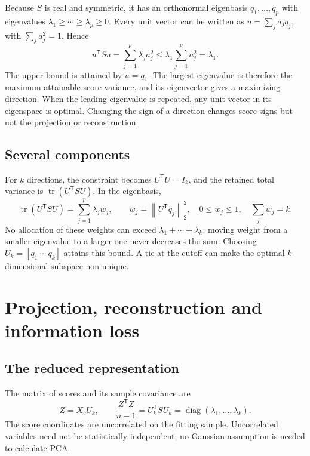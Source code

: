 \documentclass[11pt,a4paper,english]{article}
\numberwithin{equation}{section}
\DeclareMathOperator{\tr}{tr}
\newcommand{\norm}[1]{\left\lVert#1\right\rVert}
\newcommand{\T}{^{\mathsf T}}
\begin{document}
Because $S$ is real and symmetric, it has an orthonormal eigenbasis $q_1,\ldots,q_p$ with eigenvalues $\lambda_1\geq\cdots\geq\lambda_p\geq0$. Every unit vector can be written as $u=\sum_j a_jq_j$, with $\sum_j a_j^2=1$. Hence
\begin{equation}
u\T Su=\sum_{j=1}^p\lambda_j a_j^2
\leq\lambda_1\sum_{j=1}^p a_j^2=\lambda_1.
\label{eq:maximum}
\end{equation}
The upper bound is attained by $u=q_1$. The largest eigenvalue is therefore the maximum attainable score variance, and its eigenvector gives a maximizing direction. When the leading eigenvalue is repeated, any unit vector in its eigenspace is optimal. Changing the sign of a direction changes score signs but not the projection or reconstruction.

\subsection{Several components}
For $k$ directions, the constraint becomes $U\T U=I_k$, and the retained total variance is $\tr(U\T SU)$. In the eigenbasis,
\begin{equation}
\tr(U\T SU)=\sum_{j=1}^p\lambda_j w_j,
\qquad w_j=\norm{U\T q_j}_2^2,
\quad 0\leq w_j\leq1,\quad\sum_jw_j=k.
\end{equation}
No allocation of these weights can exceed $\lambda_1+\cdots+\lambda_k$: moving weight from a smaller eigenvalue to a larger one never decreases the sum. Choosing $U_k=[q_1\ \cdots\ q_k]$ attains this bound. A tie at the cutoff can make the optimal $k$-dimensional subspace non-unique.

\section{Projection, reconstruction and information loss}
\subsection{The reduced representation}
The matrix of scores and its sample covariance are
\begin{equation}
Z=X_cU_k,\qquad
\frac{Z\T Z}{n-1}=U_k\T SU_k
=\operatorname{diag}(\lambda_1,\ldots,\lambda_k).
\label{eq:scores}
\end{equation}
The score coordinates are uncorrelated on the fitting sample. Uncorrelated variables need not be statistically independent; no Gaussian assumption is needed to calculate PCA.
\end{document}
